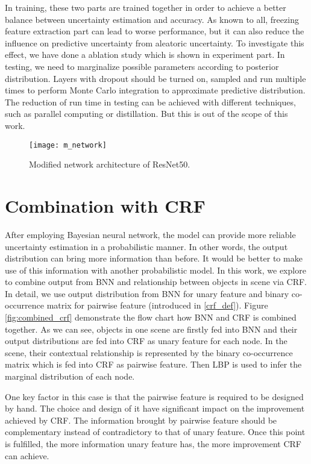 In training, these two parts are trained together in order to achieve a better balance between uncertainty estimation and accuracy. As known to all, freezing feature extraction part can lead to worse performance, but it can also reduce the influence on predictive uncertainty from aleatoric uncertainty. To investigate this effect, we have done a ablation study which is shown in experiment part. In testing, we need to marginalize possible parameters according to posterior distribution. Layers with dropout should be turned on, sampled and run multiple times to perform Monte Carlo integration to approximate predictive distribution. The reduction of run time in testing can be achieved with different techniques, such as parallel computing or distillation. But this is out of the scope of this work.
\begin{figure}[H]
	\begin{center}
		\texttt{[image: m\_network]}
		\caption{Modified network architecture of ResNet50.}		
		\label{fig:modified_net}
	\end{center}
\end{figure}

\section{Combination with CRF}\label{com_crf}
After employing Bayesian neural network, the model can provide more reliable uncertainty estimation in a probabilistic manner. In other words, the output distribution can bring more information than before. It would be better to make use of this information with another probabilistic model. In this work, we explore to combine output from BNN and relationship between objects in scene via CRF. In detail, we use output distribution from BNN for unary feature and binary co-occurrence matrix for pairwise feature (introduced in \ref{crf_def}). Figure \ref{fig:combined_crf} demonstrate the flow chart how BNN and CRF is combined together. As we can see, objects in one scene are firstly fed into BNN and their output distributions are fed into CRF as unary feature for each node. In the scene, their contextual relationship is represented by the binary co-occurrence matrix which is fed into CRF as pairwise feature. Then LBP is used to infer the marginal distribution of each node. 

One key factor in this case is that the pairwise feature is required to be designed by hand. The choice and design of it have significant impact on the improvement achieved by CRF. The information brought by pairwise feature should be complementary instead of contradictory to that of unary feature. Once this point is fulfilled, the more information unary feature has, the more improvement CRF can achieve.

